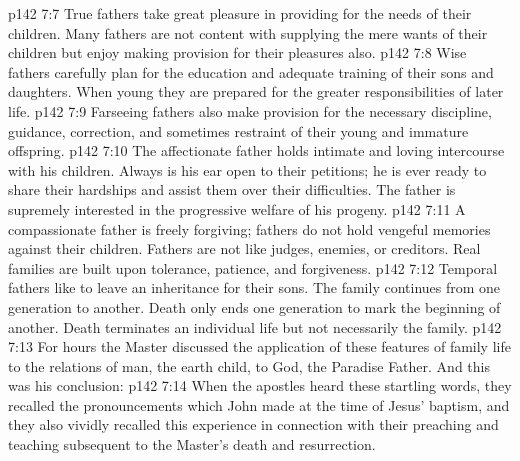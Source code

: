 \vs p142 7:7 \bibnobreakspace {} True fathers take great pleasure in providing for the needs of their children. Many fathers are not content with supplying the mere wants of their children but enjoy making provision for their pleasures also.
\vs p142 7:8 \bibnobreakspace {} Wise fathers carefully plan for the education and adequate training of their sons and daughters. When young they are prepared for the greater responsibilities of later life.
\vs p142 7:9 \bibnobreakspace {} Farseeing fathers also make provision for the necessary discipline, guidance, correction, and sometimes restraint of their young and immature offspring.
\vs p142 7:10 \bibnobreakspace {} The affectionate father holds intimate and loving intercourse with his children. Always is his ear open to their petitions; he is ever ready to share their hardships and assist them over their difficulties. The father is supremely interested in the progressive welfare of his progeny.
\vs p142 7:11 \bibnobreakspace {} A compassionate father is freely forgiving; fathers do not hold vengeful memories against their children. Fathers are not like judges, enemies, or creditors. Real families are built upon tolerance, patience, and forgiveness.
\vs p142 7:12 \bibnobreakspace {} Temporal fathers like to leave an inheritance for their sons. The family continues from one generation to another. Death only ends one generation to mark the beginning of another. Death terminates an individual life but not necessarily the family.
\vs p142 7:13 \pc For hours the Master discussed the application of these features of family life to the relations of man, the earth child, to God, the Paradise Father. And this was his conclusion: 
\vs p142 7:14 When the apostles heard these startling words, they recalled the pronouncements which John made at the time of Jesus’ baptism, and they also vividly recalled this experience in connection with their preaching and teaching subsequent to the Master’s death and resurrection.
